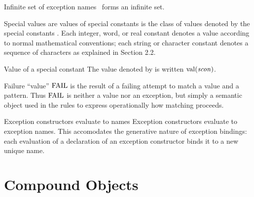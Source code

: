 \begin{clause}{Infinite set of exception names}
\Exc\ forms an infinite set.
\end{clause}

\begin{clause}{Special values are values of special constants}
{\SVal} is the class of values denoted by the special constants
\SCon. Each integer, word, or real constant denotes a value according to normal 
mathematical conventions; each string or character
constant denotes a sequence of characters as explained in Section 2.2.
\end{clause}

\begin{definition}{Value of a special constant}\index{$\sconval(\scon)$}
The value denoted by {\scon} is written $\sconval(\scon)$.
\end{definition}

\begin{clause}{Failure ``value''}
${\rm FAIL}$ is the result of a failing attempt to match a value and a
pattern. Thus ${\rm FAIL}$ is neither a value nor an exception, but simply
a semantic object used in the rules to express operationally
how matching proceeds.
\end{clause}

\begin{clause}{Exception constructors evaluate to names}
Exception constructors evaluate to exception names. This accomodates the
generative nature of exception bindings: each evaluation of a
declaration of an exception constructor binds it to a new unique name.
\end{clause}

\section{Compound Objects}

